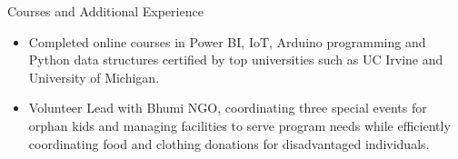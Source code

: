 \documentclass[]{mcdowellcv}
\begin{document}
	\begin{cvsection}{Courses and Additional Experience}
		\begin{cvsubsection}{}{}{}	
			\begin{itemize}
				\item Completed online courses in Power BI, IoT, Arduino programming and Python data structures certified by top universities such as UC Irvine and University of Michigan.
				\item Volunteer Lead with Bhumi NGO, coordinating three special events for orphan kids and managing facilities to serve program needs while efficiently coordinating food and clothing donations for disadvantaged individuals.
			\end{itemize}
		\end{cvsubsection}
	\end{cvsection}
	
	
\end{document}

